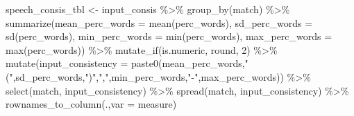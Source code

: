 \documentclass[
]{article}
\newenvironment{Shaded}{\begin{snugshade}}{\end{snugshade}}
\newcommand{\AttributeTok}[1]{\textcolor[rgb]{0.77,0.63,0.00}{#1}}
\newcommand{\DecValTok}[1]{\textcolor[rgb]{0.00,0.00,0.81}{#1}}
\newcommand{\FunctionTok}[1]{\textcolor[rgb]{0.00,0.00,0.00}{#1}}
\newcommand{\NormalTok}[1]{#1}
\newcommand{\OtherTok}[1]{\textcolor[rgb]{0.56,0.35,0.01}{#1}}
\newcommand{\SpecialCharTok}[1]{\textcolor[rgb]{0.00,0.00,0.00}{#1}}
\newcommand{\StringTok}[1]{\textcolor[rgb]{0.31,0.60,0.02}{#1}}
\begin{document}
\begin{Shaded}
\begin{Highlighting}[]
\NormalTok{speech\_consis\_tbl }\OtherTok{\textless{}{-}}\NormalTok{ input\_consis }\SpecialCharTok{\%\textgreater{}\%}
  \FunctionTok{group\_by}\NormalTok{(match) }\SpecialCharTok{\%\textgreater{}\%}
  \FunctionTok{summarize}\NormalTok{(}\AttributeTok{mean\_perc\_words =} \FunctionTok{mean}\NormalTok{(perc\_words),}
            \AttributeTok{sd\_perc\_words =} \FunctionTok{sd}\NormalTok{(perc\_words),}
            \AttributeTok{min\_perc\_words =} \FunctionTok{min}\NormalTok{(perc\_words),}
            \AttributeTok{max\_perc\_words =} \FunctionTok{max}\NormalTok{(perc\_words)) }\SpecialCharTok{\%\textgreater{}\%}
  \FunctionTok{mutate\_if}\NormalTok{(is.numeric, round, }\DecValTok{2}\NormalTok{) }\SpecialCharTok{\%\textgreater{}\%}
  \FunctionTok{mutate}\NormalTok{(}\AttributeTok{input\_consistency =} \FunctionTok{paste0}\NormalTok{(mean\_perc\_words,}\StringTok{"("}\NormalTok{,sd\_perc\_words,}\StringTok{")"}\NormalTok{,}\StringTok{","}\NormalTok{,min\_perc\_words,}\StringTok{"{-}"}\NormalTok{,max\_perc\_words)) }\SpecialCharTok{\%\textgreater{}\%}
  \FunctionTok{select}\NormalTok{(match, input\_consistency) }\SpecialCharTok{\%\textgreater{}\%}
  \FunctionTok{spread}\NormalTok{(match, input\_consistency) }\SpecialCharTok{\%\textgreater{}\%}
  \FunctionTok{rownames\_to\_column}\NormalTok{(.,}\AttributeTok{var =} \StringTok{\textquotesingle{}measure\textquotesingle{}}\NormalTok{)}
\end{Highlighting}
\end{Shaded}
\end{document}
